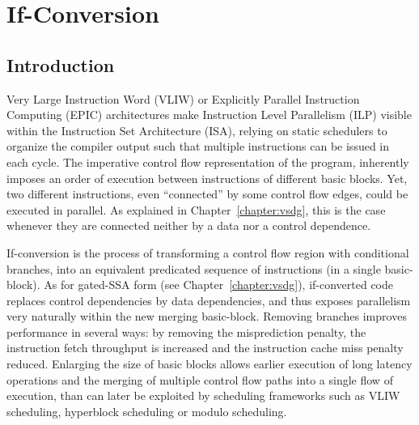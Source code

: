  \chapter{If-Conversion }\label{chapter:if_conversion}
\label{chapter:if_conversion}
\graphicspath{{img/}{if_conversion/img/}{part4/if_conversion/img/}}

\newcommand{\annotation}[1]{%
  \marginpar{\small\itshape\color{red}#1}}



\section{Introduction}

Very Large Instruction Word (VLIW) or Explicitly Parallel Instruction Computing (EPIC) architectures make Instruction Level Parallelism (ILP) visible within the Instruction Set Architecture (ISA), relying on static schedulers to organize the compiler output such that multiple instructions can be issued in each cycle.
The imperative control flow representation of the program, inherently imposes an order of execution between instructions of different basic blocks. Yet, two different instructions, even ``connected'' by some control flow edges, could be executed in parallel. As explained in Chapter~\ref{chapter:vsdg}, this is the case whenever they are connected neither by a data nor a control dependence. 

If-conversion is the process of transforming a control flow region with conditional branches, into an equivalent predicated sequence of instructions (in a single basic-block). As for gated-SSA form (see Chapter~\ref{chapter:vsdg}), if-converted code replaces control dependencies by data dependencies, and thus exposes parallelism very naturally within the new merging basic-block. 
Removing branches improves performance in several ways: by removing the misprediction penalty, the instruction fetch throughput is increased and the instruction cache miss penalty reduced. Enlarging the size of basic blocks allows earlier execution of long latency operations and the merging of multiple control flow paths into a single flow of execution, than can later be exploited by scheduling frameworks such as VLIW scheduling, hyperblock scheduling or modulo scheduling.

